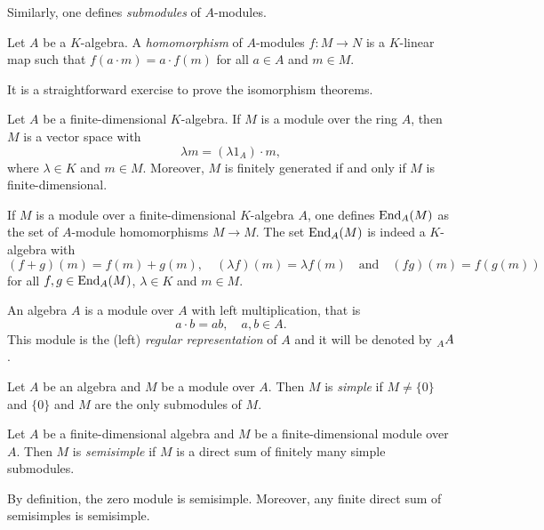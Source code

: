 Similarly, one defines \emph{submodules} of $A$-modules. 

\begin{definition}
Let $A$ be a $K$-algebra. 
A \emph{homomorphism} of $A$-modules 
$f\colon M\to N$ is a $K$-linear map such that $f(a\cdot m)=a\cdot f(m)$ for all
$a\in A$ and $m\in M$.  
\end{definition}

It is a straightforward exercise to 
prove the isomorphism theorems. 

Let $A$ be a finite-dimensional $K$-algebra. 
If $M$ is a module over the ring $A$, then $M$ is a vector space with  
\[
\lambda m=(\lambda 1_A)\cdot m, 
\]
where $\lambda\in K$ and $m\in M$. 
Moreover, $M$ is finitely generated if and only if $M$ is finite-dimensional.  

\begin{example}
If $M$ is a module over a finite-dimensional $K$-algebra $A$, one defines $\operatorname{End}_A(M)$ as the set
of $A$-module homomorphisms $M\to M$. The set  
$\operatorname{End}_A(M)$ is indeed a $K$-algebra with 
\[
(f+g)(m)=f(m)+g(m),\quad 
(\lambda f)(m)=\lambda f(m)
\quad\text{and}
\quad 
(fg)(m)=f(g(m))
\]
for all $f,g\in\operatorname{End}_A(M)$, 
$\lambda\in K$ and $m\in M$. 
\end{example}


\begin{example}
An algebra  $A$ is a module over $A$ with left multiplication, that is 
\[
a\cdot b=ab,\quad a,b\in A.
\]
This module is the (left) \emph{regular representation} of $A$ and it will be denoted by $\prescript{}{A}{A}$. 
\end{example}

\begin{definition}
	Let $A$ be an algebra and $M$ be a module over $A$. Then 
	$M$ is \emph{simple} if $M\ne\{0\}$ and $\{0\}$ and $M$ 
	are the only submodules of $M$.	
\end{definition}

\begin{definition}
	Let $A$ be a finite-dimensional 
	algebra and $M$ be a finite-dimensional module over $A$. Then 
	$M$ is \emph{semisimple} if $M$ is a direct sum of 
	finitely many simple submodules.  
\end{definition}

By definition, the zero module is semisimple. Moreover, 
any finite direct sum of semisimples is semisimple. 

